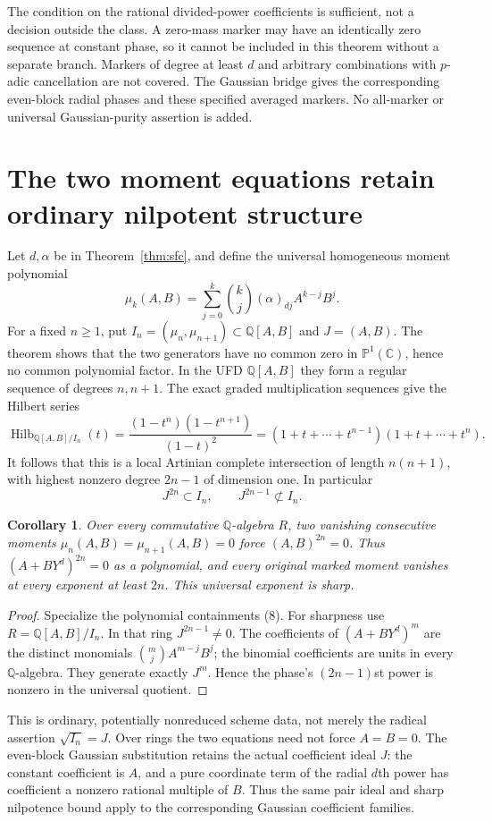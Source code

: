 \documentclass[11pt]{article}
\newtheorem{corollary}[theorem]{Corollary}
\newcommand{\Q}{\mathbb Q}
\newcommand{\C}{\mathbb C}
\begin{document}
The condition on the rational divided-power coefficients is sufficient,
not a decision outside the class. A zero-mass marker may have an
identically zero sequence at constant phase, so it cannot be included in
this theorem without a separate branch. Markers of degree at least $d$
and arbitrary combinations with $p$-adic cancellation are not covered.
The Gaussian bridge gives the corresponding even-block radial phases
and these specified averaged markers. No all-marker or universal
Gaussian-purity assertion is added.

\section{The two moment equations retain ordinary nilpotent structure}
Let $d,\alpha$ be in Theorem~\ref{thm:sfc}, and define the universal
homogeneous moment polynomial
\[
 \mu_k(A,B)=\sum_{j=0}^k\binom kj(\alpha)_{dj}A^{k-j}B^j.
\]
For a fixed $n\ge1$, put
$I_n=(\mu_n,\mu_{n+1})\subset\Q[A,B]$ and $J=(A,B)$.
The theorem shows that the two generators have no common zero in
$\mathbb P^1(\C)$, hence no common polynomial factor. In the UFD
$\Q[A,B]$ they form a regular sequence of degrees $n,n+1$.
The exact graded multiplication sequences give the Hilbert series
\[
 \operatorname{Hilb}_{\Q[A,B]/I_n}(t)
  =\frac{(1-t^n)(1-t^{n+1})}{(1-t)^2}
  =(1+t+\cdots+t^{n-1})(1+t+\cdots+t^n).          \tag{7}
\]
It follows that this is a local Artinian complete intersection of length
$n(n+1)$, with highest nonzero degree $2n-1$ of dimension one. In particular
\[
 J^{2n}\subset I_n,\qquad J^{2n-1}\not\subset I_n. \tag{8}
\]

\begin{corollary}\label{cor:ordinary}
Over every commutative $\Q$-algebra $R$, two vanishing consecutive moments
$\mu_n(A,B)=\mu_{n+1}(A,B)=0$ force $(A,B)^{2n}=0$.
Thus $(A+BY^d)^{2n}=0$ as a polynomial, and every original marked moment
vanishes at every exponent at least $2n$. This universal exponent is sharp.
\end{corollary}
\begin{proof}
Specialize the polynomial containments (8). For sharpness use
$R=\Q[A,B]/I_n$. In that ring $J^{2n-1}\ne0$. The coefficients of
$(A+BY^d)^m$ are the distinct monomials
$\binom mj A^{m-j}B^j$; the binomial coefficients are units in every
$\Q$-algebra. They generate exactly $J^m$. Hence the phase's
$(2n-1)$st power is nonzero in the universal quotient.
\end{proof}

This is ordinary, potentially nonreduced scheme data, not merely the
radical assertion $\sqrt{I_n}=J$. Over rings the two equations need not
force $A=B=0$. The even-block Gaussian substitution retains the actual
coefficient ideal $J$: the constant coefficient is $A$, and a pure
coordinate term of the radial $d$th power has coefficient a nonzero
rational multiple of $B$. Thus the same pair ideal and sharp nilpotence
bound apply to the corresponding Gaussian coefficient families.
\end{document}
